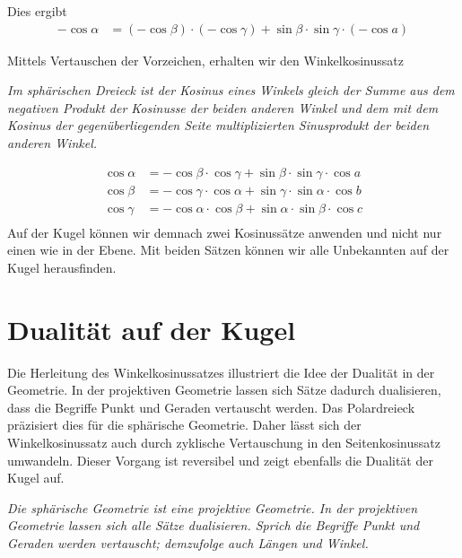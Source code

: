 \begin{refsection}
Dies ergibt
\begin{align*}
{-\cos \alpha} &= {(-\cos \beta)} \cdot {(-\cos \gamma)} + {\sin \beta} \cdot {\sin \gamma} \cdot {(-\cos a)}
\end{align*}

Mittels Vertauschen der Vorzeichen, erhalten wir den Winkelkosinussatz

\begin{satz}\textit{Im sphärischen Dreieck ist der Kosinus eines Winkels gleich der Summe aus dem negativen Produkt der Kosinusse der beiden anderen Winkel und dem mit dem Kosinus der gegenüberliegenden Seite multiplizierten Sinusprodukt der beiden anderen Winkel.}
\label{skript:kugel:satz:Winkelkosinussatz}
\end{satz}
\begin{align*}
{\cos \alpha} &= {-\cos \beta} \cdot {\cos \gamma} + {\sin \beta} \cdot {\sin \gamma} \cdot {\cos a}\\
{\cos \beta} &= {-\cos \gamma} \cdot {\cos \alpha} + {\sin \gamma} \cdot {\sin \alpha} \cdot {\cos b}\\
{\cos \gamma} &= {-\cos \alpha} \cdot {\cos \beta} + {\sin \alpha} \cdot {\sin \beta} \cdot {\cos c}\\
\end{align*}
Auf der Kugel können wir demnach zwei Kosinussätze anwenden und nicht nur einen wie in der Ebene. Mit beiden Sätzen können wir alle Unbekannten auf der Kugel herausfinden.



\section{Dualität auf der Kugel}
Die Herleitung des Winkelkosinussatzes illustriert die Idee der Dualität in der Geometrie. In der projektiven Geometrie lassen sich Sätze dadurch dualisieren, dass die Begriffe Punkt und Geraden vertauscht werden. Das Polardreieck präzisiert dies für die sphärische Geometrie.
Daher lässt sich der Winkelkosinussatz auch durch zyklische Vertauschung in den Seitenkosinussatz umwandeln. Dieser Vorgang ist reversibel und zeigt ebenfalls die Dualität der Kugel auf.

\begin{satz}\textit{Die sphärische Geometrie ist eine projektive Geometrie. In der projektiven Geometrie lassen sich alle Sätze dualisieren. Sprich die Begriffe Punkt und Geraden werden vertauscht; demzufolge auch Längen und Winkel.}
\label{skript:kugel:satz:Dualitaet}
\end{satz}


\end{refsection}

